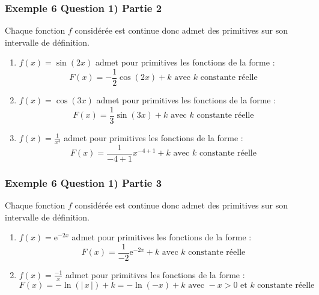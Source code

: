 \documentclass[11pt, hyperref={urlcolor=red,%
            linkcolor=blue, %
            colorlinks=true}]{beamer}
\newcommand{\e}{\text{e}}
\newcommand{\valabs}[1]{\big| \, #1 \, \big|}
\begin{document}
\begin{frame}
\frametitle{Exemple 6 Question 1) Partie 2}
\renewcommand{\theenumi}{\alph{enumi}}

Chaque fonction $f$ considérée est continue donc admet des primitives sur son intervalle de définition.

\begin{enumerate}

 \item  $f(x)= \sin(2x)$ admet pour primitives les fonctions de la forme :
 $$F(x)=-\frac{1}{2}\cos(2x) +  k \text{ avec } k \text{ constante réelle}$$
 
\item  $f(x)=\cos(3x)$  admet pour primitives les fonctions de la forme :
 $$F(x)=\frac{1}{3}\sin(3x) +  k \text{ avec } k \text{ constante réelle}$$
 
 \item  $f(x)=\frac{1}{x^4}$ admet pour primitives les fonctions de la forme :
 $$F(x)=\frac{1}{-4+1}x^{-4+1} +  k \text{ avec } k \text{ constante réelle}$$

 

\end{enumerate}

\end{frame}



\begin{frame}
\frametitle{Exemple 6 Question 1) Partie 3}
\renewcommand{\theenumi}{\alph{enumi}}

Chaque fonction $f$ considérée est continue donc admet des primitives sur son intervalle de définition.

\begin{enumerate}

 \item  $f(x)=\e^{-2x}$ admet pour primitives les fonctions de la forme :
 $$F(x)=\frac{1}{-2}\e^{-2x} +  k \text{ avec } k \text{ constante réelle}$$
 
 \item  $f(x)= \frac{-1}{x}$ admet pour primitives les fonctions de la forme :
 $$F(x)=-\ln(\valabs{x}) +  k  = -\ln(-x) +  k \text{ avec } -x>0  \text{ et } k \text{ constante réelle}$$
 

\end{enumerate}

\end{frame}
\end{document}
